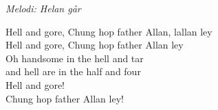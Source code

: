 {\footnotesize\textit{Melodi: Helan går}}\par
\vspace{10pt}
Hell and gore, Chung hop father Allan, lallan ley\\
Hell and gore, Chung hop father Allan ley\\
Oh handsome in the hell and tar\\
and hell are in the half and four\\
Hell and gore!\\
Chung hop father Allan ley!
